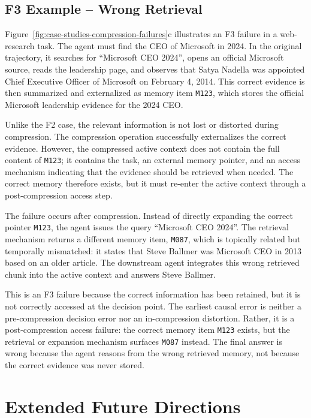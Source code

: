 \subsection{F3 Example -- Wrong Retrieval}
\label{app:case-f3-wrong-retrieval}

Figure~\ref{fig:case-studies-compression-failures}c illustrates an F3 failure in a web-research task. 
The agent must find the CEO of Microsoft in 2024. 
In the original trajectory, it searches for ``Microsoft CEO 2024'', opens an official Microsoft source, reads the leadership page, and observes that Satya Nadella was appointed Chief Executive Officer of Microsoft on February 4, 2014. 
This correct evidence is then summarized and externalized as memory item \texttt{M123}, which stores the official Microsoft leadership evidence for the 2024 CEO.

Unlike the F2 case, the relevant information is not lost or distorted during compression. 
The compression operation successfully externalizes the correct evidence. 
However, the compressed active context does not contain the full content of \texttt{M123}; it contains the task, an external memory pointer, and an access mechanism indicating that the evidence should be retrieved when needed. 
The correct memory therefore exists, but it must re-enter the active context through a post-compression access step.

The failure occurs after compression. 
Instead of directly expanding the correct pointer \texttt{M123}, the agent issues the query ``Microsoft CEO 2024''. 
The retrieval mechanism returns a different memory item, \texttt{M087}, which is topically related but temporally mismatched: it states that Steve Ballmer was Microsoft CEO in 2013 based on an older article. 
The downstream agent integrates this wrong retrieved chunk into the active context and answers Steve Ballmer.

This is an F3 failure because the correct information has been retained, but it is not correctly accessed at the decision point. 
The earliest causal error is neither a pre-compression decision error nor an in-compression distortion. 
Rather, it is a post-compression access failure: the correct memory item \texttt{M123} exists, but the retrieval or expansion mechanism surfaces \texttt{M087} instead. 
The final answer is wrong because the agent reasons from the wrong retrieved memory, not because the correct evidence was never stored.


\section{Extended Future Directions}
\label{ap:extended_future_directions}

